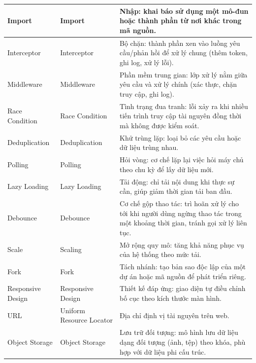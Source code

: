 \begin{longtable}{|L{0.18\textwidth}|L{0.27\textwidth}|L{0.49\textwidth}|}
Import & Import & Nhập: khai báo sử dụng một mô-đun hoặc thành phần từ nơi khác trong mã nguồn. \\
\hline

Interceptor & Interceptor & Bộ chặn: thành phần xen vào luồng yêu cầu/phản hồi để xử lý chung (thêm token, ghi log, xử lý lỗi). \\
\hline

Middleware & Middleware & Phần mềm trung gian: lớp xử lý nằm giữa yêu cầu và xử lý chính (xác thực, chặn truy cập, ghi log). \\
\hline

Race Condition & Race Condition & Tình trạng đua tranh: lỗi xảy ra khi nhiều tiến trình truy cập tài nguyên đồng thời mà không được kiểm soát. \\
\hline

Deduplication & Deduplication & Khử trùng lặp: loại bỏ các yêu cầu hoặc dữ liệu trùng nhau. \\
\hline

Polling & Polling & Hỏi vòng: cơ chế lặp lại việc hỏi máy chủ theo chu kỳ để lấy dữ liệu mới. \\
\hline

Lazy Loading & Lazy Loading & Tải động: chỉ tải nội dung khi thực sự cần, giúp giảm thời gian tải ban đầu. \\
\hline

Debounce & Debounce & Cơ chế gộp thao tác: trì hoãn xử lý cho tới khi người dùng ngừng thao tác trong một khoảng thời gian, tránh gọi xử lý liên tục. \\
\hline

Scale & Scaling & Mở rộng quy mô: tăng khả năng phục vụ của hệ thống theo mức tải. \\
\hline

Fork & Fork & Tách nhánh: tạo bản sao độc lập của một dự án hoặc mã nguồn để phát triển riêng. \\
\hline

Responsive Design & Responsive Design & Thiết kế đáp ứng: giao diện tự điều chỉnh bố cục theo kích thước màn hình. \\
\hline

URL & Uniform Resource Locator & Địa chỉ định vị tài nguyên trên web. \\
\hline

Object Storage & Object Storage & Lưu trữ đối tượng: mô hình lưu dữ liệu dạng đối tượng (ảnh, tệp) theo khóa, phù hợp với dữ liệu phi cấu trúc. \\
\hline


\end{longtable}
